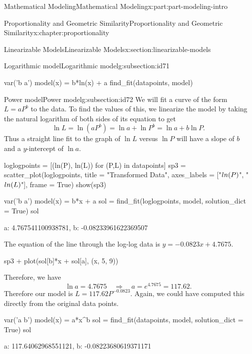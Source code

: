 \documentclass[oneside,10pt,]{book}
\numberwithin{equation}{section}
\begin{document}
\begin{partptx}{Mathematical Modeling}{}{Mathematical Modeling}{}{}{x:part:part-modeling-intro}
\begin{chapterptx}{Proportionality and Geometric Similarity}{}{Proportionality and Geometric Similarity}{}{}{x:chapter:proportionality}
\begin{sectionptx}{Linearizable Models}{}{Linearizable Models}{}{}{x:section:linearizable-models}
\begin{subsectionptx}{Logarithmic model}{}{Logarithmic model}{}{}{g:subsection:id71}
\begin{sageinput}
var('b a')
model(x) = b*ln(x) + a
find_fit(datapoints, model)
\end{sageinput}
\end{subsectionptx}
%
%
\typeout{************************************************}
\typeout{************************************************}
%
\begin{subsectionptx}{Power model}{}{Power model}{}{}{g:subsection:id72}
We will fit a curve of the form \(L=aP^b\) to the data.  To find the values of this, we linearize the model by taking the natural logarithm of both sides of its equation to get%
%
\begin{equation*}
\ln L = \ln(aP^b) = \ln a + \ln P^b = \ln a + b\ln P.
\end{equation*}
Thus a straight line fit to the graph of \(\ln L\) versus \(\ln P\) will have a slope of \(b\) and a \(y\)-intercept of \(\ln a\).%
\begin{sageinput}
loglogpoints = [(ln(P), ln(L)) for (P,L) in datapoints]
sp3 = scatter_plot(loglogpoints, title = "Transformed Data", 
	axes_labels = ["$\\ln(P)$", "$\\ln(L)$"], frame = True)
show(sp3)
\end{sageinput}
\begin{sageinput}
var('b a')
model(x) = b*x + a
sol = find_fit(loglogpoints, model, solution_dict = True)
sol
\end{sageinput}
\begin{sageoutput}
{a: 4.767541100938781, b: -0.08233961622369507}
\end{sageoutput}
The equation of the line through the log-log data is \(y = -0.0823x + 4.7675\).%
\begin{sageinput}
sp3 + plot(sol[b]*x + sol[a], (x, 5, 9))
\end{sageinput}
Therefore, we have%
%
\begin{equation*}
\ln a = 4.7675 \quad\Longrightarrow\quad a = e^{4.7675} = 117.62.
\end{equation*}
Therefore our model is \(L = 117.62P^{-0.0823}\). Again, we could have computed this directly from the original data points.%
\begin{sageinput}
var('a b')
model(x) = a*x^b
sol = find_fit(datapoints, model, solution_dict = True)
sol
\end{sageinput}
\begin{sageoutput}
{a: 117.64062968551121, b: -0.08223680619371171}

\end{sageoutput}
\end{subsectionptx}
\end{sectionptx}
\end{chapterptx}
\end{partptx}
\end{document}
